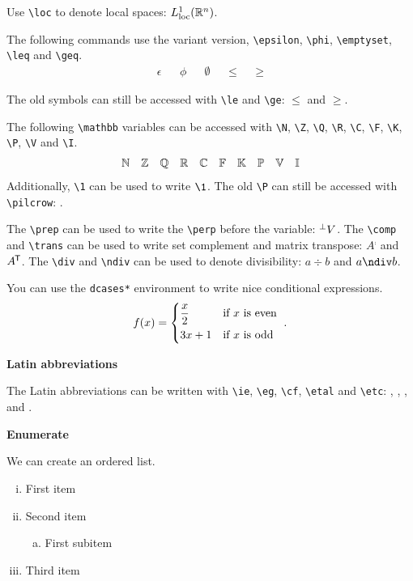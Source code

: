 \documentclass{myassignment}
\begin{document}
Use \verb|\loc| to denote local spaces: $L_{\mathrm{loc}}^1(\mathbb{R}^n)$.

The following commands use the variant version, \verb|\epsilon|, \verb|\phi|, \verb|\emptyset|, \verb|\leq| and \verb|\geq|.
\begin{align*}
    \epsilon && \phi && \emptyset && \leq && \geq
\end{align*}

The old symbols can still be accessed with \verb|\le| and \verb|\ge|: $\le$ and $\ge$.

The following \verb|\mathbb| variables can be accessed with \verb|\N|, \verb|\Z|, \verb|\Q|, \verb|\R|, \verb|\C|, \verb|\F|, \verb|\K|, \verb|\P|, \verb|\V| and \verb|\I|.
\begin{align*}
    \mathbb{N} && \mathbb{Z} && \mathbb{Q} && \mathbb{R} && \mathbb{C} && \mathbb{F} && \mathbb{K} && \mathbb{P} && \mathbb{V} && \mathbb{I}
\end{align*}
Additionally, \verb|\1| can be used to write $\1$. The old \verb|\P| can still be accessed with \verb|\pilcrow|: \pilcrow.

The \verb|\prep| can be used to write the \verb|\perp| before the variable: ${}^\perp V$. The \verb|\comp| and \verb|\trans| can be used to write set complement and matrix transpose: $A^\comp$ and $A^{\mkern-1.5mu\mathsf{T}}$. The \verb|\div| and \verb|\ndiv| can be used to denote divisibility: $a \div b$ and $a \ndiv b$.

You can use the \verb|dcases*| environment to write nice conditional expressions.
\begin{align*}
    f(x) = \begin{dcases*}
        \frac{x}{2} & if $x$ is even \\
        3x + 1 & if $x$ is odd
    \end{dcases*}.
\end{align*}

\textbf{Latin abbreviations}

The Latin abbreviations can be written with \verb|\ie|, \verb|\eg|, \verb|\cf|, \verb|\etal| and \verb|\etc|: \ie, \eg, \cf, \etal and \etc.

\newpage

\textbf{Enumerate}

We can create an ordered list.

\begin{enumerate}[i.]
    \item First item
    \item Second item
    \begin{enumerate}[(a)]
        \item First subitem
    \end{enumerate}
    \item Third item
\end{enumerate}
\end{document}
